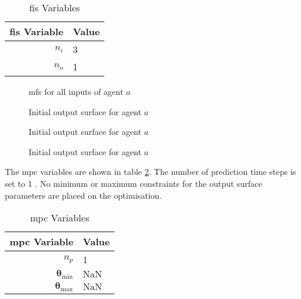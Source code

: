 \documentclass[conference]{IEEEtran}
\begin{document}
\begin{table}[]
    \centering
    \caption{\gls{fis} Variables}
    \label{tab:settings_general_fis}
    \begin{tabular}{r|l}
    \toprule
        \gls{fis} Variable & Value \\
        \midrule
        $n_{i}$ & 3\\
        $n_{o}$ & 1\\
        \bottomrule
    \end{tabular}
\end{table}

\begin{figure}
    \centering
    
    \caption{\gls{mf}s for all inputs of agent $a$}
    \label{fig:fis_mfs}
\end{figure}

\begin{figure}
    \centering
    
    \caption{Initial output surface for agent $a$}
    \label{fig:fis_output_surface_1}
\end{figure}

\begin{figure}
    \centering
    
    \caption{Initial output surface for agent $a$}
    \label{fig:fis_output_surface_2}
\end{figure}

\begin{figure}
    \centering
    
    \caption{Initial output surface for agent $a$}
    \label{fig:fis_output_surface_3}
\end{figure}

The \gls{mpc} variables are shown in table \ref{tab:settings_general_mpc}.
The number of prediction time steps is set to 1 .
No minimum or maximum constraints for the output surface parameters are placed on the optimisation.

\begin{table}[]
    \centering
    \caption{\gls{mpc} Variables}
    \label{tab:settings_general_mpc}
    \begin{tabular}{r|l}
        \toprule
        \gls{mpc} Variable & Value \\
        \midrule
        $n_{p}$                     & 1\\
        $\bm{\theta}_{\text{min}}$  & $\text{NaN}$\\
        $\bm{\theta}_{\text{max}}$  & $\text{NaN}$\\
        \bottomrule
    \end{tabular}
\end{table}
\end{document}
